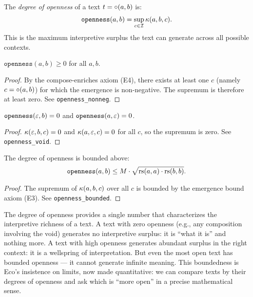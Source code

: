 \begin{definition}
\label{def:degree-openness}
The \emph{degree of openness} of a text $t = \circ(a, b)$ is:
\[
  \texttt{openness}(a, b) = \sup_{c \in \mathcal{I}} \kappa(a, b, c).
\]
This is the maximum interpretive surplus the text can generate across
all possible contexts.
\end{definition}

\begin{theorem}
\label{thm:openness-nonneg}
$\texttt{openness}(a, b) \geq 0$ for all $a, b$.
\end{theorem}

\begin{proof}
By the compose-enriches axiom (E4), there exists at least one $c$
(namely $c = \circ(a,b)$) for which the emergence is non-negative.
The supremum is therefore at least zero. See
\texttt{openness\_nonneg}.
\end{proof}

\begin{theorem}
\label{thm:openness-void}
$\texttt{openness}(\varepsilon, b) = 0$ and $\texttt{openness}(a, \varepsilon) = 0$.
\end{theorem}

\begin{proof}
$\kappa(\varepsilon, b, c) = 0$ and $\kappa(a, \varepsilon, c) = 0$ for all
$c$, so the supremum is zero. See \texttt{openness\_void}.
\end{proof}

\begin{theorem}
\label{thm:openness-bounded}
The degree of openness is bounded above:
\[
  \texttt{openness}(a, b) \leq M \cdot \sqrt{\mathrm{rs}(a, a) \cdot \mathrm{rs}(b, b)}.
\]
\end{theorem}

\begin{proof}
The supremum of $\kappa(a, b, c)$ over all $c$ is bounded by the
emergence bound axiom (E3). See \texttt{openness\_bounded}.
\end{proof}

\begin{interpretation}
The degree of openness provides a single number that characterizes the
interpretive richness of a text. A text with zero openness (e.g., any
composition involving the void) generates no interpretive surplus: it
is ``what it is'' and nothing more. A text with high openness generates
abundant surplus in the right context: it is a wellspring of
interpretation. But even the most open text has bounded openness ---
it cannot generate infinite meaning. This boundedness is Eco's
insistence on limits, now made quantitative: we can compare texts
by their degrees of openness and ask which is ``more open'' in a
precise mathematical sense.
\end{interpretation}

